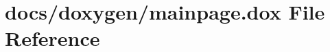\hypertarget{mainpage_8dox}{\section{docs/doxygen/mainpage.dox File Reference}
\label{mainpage_8dox}
}

